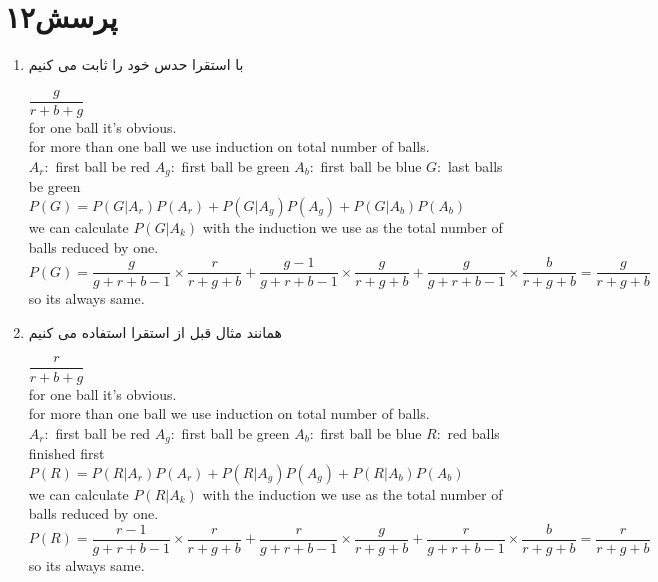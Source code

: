 \documentclass[a4paper]{article}
\begin{document}
\section*{پرسش۱۲}
\begin{enumerate}
\item{}
با استقرا حدس خود را ثابت می کنیم
\begin{latin}
$\dfrac{g}{r+b+g}$\\
for one ball it's obvious.\\
for more than one ball we use induction on total number of balls.\\
$A_r: $ first ball be red
$A_g: $ first ball be green
$A_b: $ first ball be blue
$G: $ last balls be green
$P(G) = P(G|A_r)P(A_r) + P(G|A_g)P(A_g) + P(G|A_b)P(A_b)$\\
we can calculate $P(G|A_k) $ with the induction we use as the total number of balls reduced by one.\\
$P(G) = \dfrac{g}{g+r+b-1} \times \dfrac{r}{r+g+b} +  \dfrac{g-1}{g+r+b-1} \times \dfrac{g}{r+g+b} +  \dfrac{g}{g+r+b-1} \times \dfrac{b}{r+g+b} = \dfrac{g}{r+g+b}$\\
so its always same.

\end{latin}
\item{}
همانند مثال قبل از استقرا استفاده می کنیم
\begin{latin}
$\dfrac{r}{r+b+g}$\\
for one ball it's obvious.\\
for more than one ball we use induction on total number of balls.\\
$A_r: $ first ball be red
$A_g: $ first ball be green
$A_b: $ first ball be blue
$R: $ red balls finished first
$P(R) = P(R|A_r)P(A_r) + P(R|A_g)P(A_g) + P(R|A_b)P(A_b)$\\
we can calculate $P(R|A_k) $ with the induction we use as the total number of balls reduced by one.\\
$P(R) = \dfrac{r-1}{g+r+b-1} \times \dfrac{r}{r+g+b} +  \dfrac{r}{g+r+b-1} \times \dfrac{g}{r+g+b} +  \dfrac{r}{g+r+b-1} \times \dfrac{b}{r+g+b} = \dfrac{r}{r+g+b}$\\
so its always same.

\end{latin}

\end{enumerate}
\pagebreak
\end{document}
